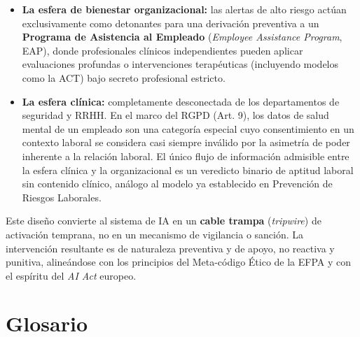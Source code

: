\documentclass[IB]{TFUOC}%
\begin{document}
\begin{enumerate}
\begin{itemize}
        \item \textbf{La esfera de bienestar organizacional:} las alertas de alto riesgo actúan exclusivamente como detonantes para una derivación preventiva a un \textbf{Programa de Asistencia al Empleado} (\textit{Employee Assistance Program}, EAP), donde profesionales clínicos independientes pueden aplicar evaluaciones profundas o intervenciones terapéuticas (incluyendo modelos como la ACT) bajo secreto profesional estricto.
        
        \item \textbf{La esfera clínica:} completamente desconectada de los departamentos de seguridad y RRHH. 
        En el marco del RGPD (Art. 9), los datos de salud mental de un empleado son una categoría especial cuyo consentimiento en un contexto laboral se considera 
        casi siempre inválido por la asimetría de poder inherente a la relación laboral. El único flujo de información admisible entre la esfera clínica y la organizacional es un veredicto binario de aptitud laboral sin contenido clínico, análogo al modelo 
        ya establecido en Prevención de Riesgos Laborales.
    \end{itemize}
    
    \noindent Este diseño convierte al sistema de IA en un \textbf{cable trampa} (\textit{tripwire}) de activación temprana, no en un mecanismo de vigilancia o sanción. 
    La intervención resultante es de naturaleza preventiva y de apoyo, no reactiva y punitiva, alineándose con los principios del Meta-código Ético de la EFPA y con el 
    espíritu del \textit{AI Act} europeo.

\end{enumerate}


\chapter{Glosario}
\end{document}
